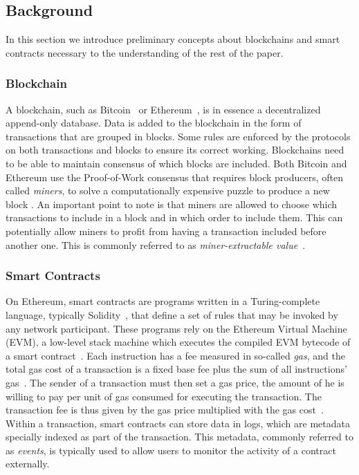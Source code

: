 \subsection{Background}
\label{sec:background}
In this section we introduce preliminary concepts about blockchains and smart contracts necessary to the understanding of the rest of the paper.

\subsubsection{Blockchain}

A blockchain, such as Bitcoin~\cite{Nakamoto} or Ethereum~\cite{wood2014ethereum}, is in essence a decentralized append-only database.
Data is added to the blockchain in the form of transactions that are grouped in blocks.
Some rules are enforced by the protocols on both transactions and blocks to ensure its correct working.
Blockchains need to be able to maintain consensus of which blocks are included.
Both Bitcoin and Ethereum use the Proof-of-Work consensus that requires block producers, often called \emph{miners}, to solve a computationally expensive puzzle to produce a new block \cite{Perez2020c}.
An important point to note is that miners are allowed to choose which transactions to include in a block and in which order to include them.
This can potentially allow miners to profit from having a transaction included before another one.
This is commonly referred to as \emph{miner-extractable value}~\cite{daian2020flash}.

\subsubsection{Smart Contracts}
On Ethereum, smart contracts are programs written in a Turing-complete language, typically Solidity~\cite{docs:solidity}, that define a set of rules that may be invoked by any network participant. 
These programs rely on the Ethereum Virtual Machine (EVM), a low-level stack machine which executes the compiled EVM bytecode of a smart contract~\cite{wood2014ethereum}.
Each instruction has a fee measured in so-called \textit{gas}, and the total gas cost of a transaction is a fixed base fee plus the sum of all instructions' gas~\cite{albert2020gasol,Perez2020f}.
The sender of a transaction must then set a gas price, the amount of  he is willing to pay per unit of gas consumed for executing the transaction.
The transaction fee is thus given by the gas price multiplied with the gas cost~\cite{werner2020step,pierro2019influence}.
Within a transaction, smart contracts can store data in logs, which are metadata specially indexed as part of the transaction.
This metadata, commonly referred to as \textit{events}, is typically used to allow users to monitor the activity of a contract externally.

